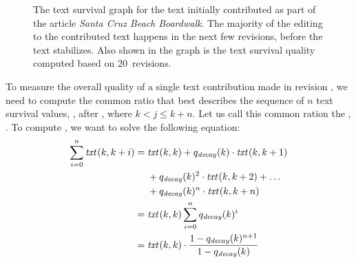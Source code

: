 \begin{figure}[tbph]
\centering
{}
\caption{The text survival graph for the text initially contributed
	as part of the article \textit{Santa Cruz Beach Boardwalk}.
	The majority of the editing to the contributed text happens
	in the next few revisions, before the text stabilizes.
	Also shown in the graph is the text survival quality
	computed based on 20~revisions.
	}
\label{fig:ts-SantaCruzBeachBoardwalk}
\end{figure}

To measure the overall quality of a single text contribution
made in revision , we need to compute the common ratio
that best describes the sequence of $n$ text survival values,
, after , where $k < j \le k+n$.
Let us call this common ration the , .
To compute , we want to solve the following equation:
\begin{align*}
    \sum_{i=0}^n \mathit{txt}_{}(k,k+i) = {} & \mathit{txt}_{}(k,k) + q_\mathit{decay}(k) \cdot \mathit{txt}_{}(k,k+1) \\
    & + q_\mathit{decay}(k)^2 \cdot \mathit{txt}_{}(k,k+2) + \ldots \\
    & + q_\mathit{decay}(k)^n \cdot \mathit{txt}_{}(k,k+n) \\
    = {} & \mathit{txt}_{}(k,k) \sum_{i=0}^n q_\mathit{decay}(k)^i \\
    = {} & \mathit{txt}_{}(k,k) \cdot \frac{1 - q_\mathit{decay}(k)^{n+1}}{1 - q_\mathit{decay}(k)} \\
\end{align*}

